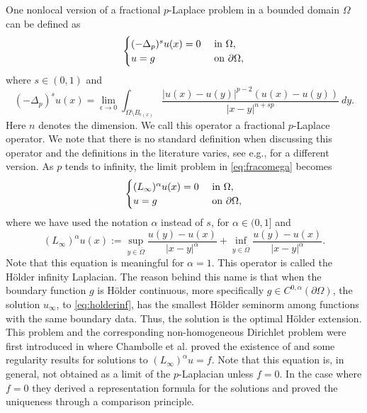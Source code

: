 \documentclass[11pt]{article}
\newcommand{\ol}{\overline}
\numberwithin{equation}{section}
\theoremstyle{definition}
\begin{document}
 One nonlocal version of a fractional $p$-Laplace problem in a bounded domain $\Omega$ can be defined as
\begin{align} \label{eq:fracomega}
     \begin{cases}
                (-\Delta_p)^{s}u(x)  = 0 & \textup{ in } \Omega, \\
                    u =g & \textup{ on } \partial \Omega, 
     \end{cases}
\end{align}
where $s \in (0,1)$ and
\begin{equation}\label{eq:fraclap}
(-\Delta_p)^{s}u(x) = \lim_{\epsilon \to 0} \int_{\Omega\setminus B_{\epsilon(x)}} \frac{|u(x)-u(y)|^{p-2}(u(x)-u(y))}{|x-y|^{n+s p}} \ dy.
\end{equation}
Here $n$ denotes the dimension. We call this operator a fractional $p$-Laplace operator. We note that there is no standard definition when discussing this operator and the definitions in the literature varies, see e.g.,  \cite{STD2018} for a different version. As $p$ tends to infinity, the limit problem in \eqref{eq:fracomega} becomes
\begin{align} \label{eq:holderinf}
     \begin{cases}
               (L_{\infty})^{\alpha} u(x)=0  & \textup{ in } \Omega, \\
                    u =g & \textup{ on } \partial \Omega, 
     \end{cases}
\end{align}
 where we have used the notation $\alpha$ instead of $s$, for $\alpha \in (0,1]$ and
$$
(L_{\infty})^{\alpha} u(x) := \sup_{y \in \ol{\Omega}} \frac{u(y)-u(x)}{|x-y|^{\alpha}} + \inf_{y \in \ol{\Omega}} \frac{u(y)-u(x)}{|x-y|^{\alpha}}.
$$
Note that this equation is meaningful for $\alpha=1$. This operator is called the Hölder infinity Laplacian. The reason behind this name is that when the boundary function $g$ is Hölder continuous, more specifically $g \in C^{0, \alpha}(\partial \Omega)$, the solution $u_{\infty}$, to \eqref{eq:holderinf}, has the smallest Hölder seminorm among functions with the same boundary data. Thus, the solution is the optimal Hölder extension. This problem and the corresponding non-homogeneous Dirichlet problem were first introduced in \cite{CLM2012} where Chambolle et al. proved the existence of and some regularity results for solutions to $(L_{\infty})^{\alpha} u = f$. Note that this equation is, in general, not obtained as a limit of the $p$-Laplacian unless $f=0$. In the case where $f=0$ they derived a representation formula for the solutions and proved the uniqueness through a comparison principle. 
\end{document}
